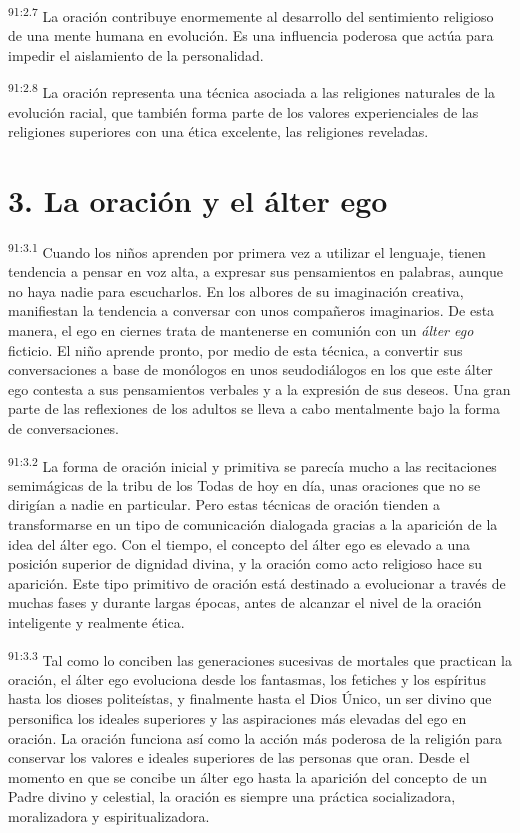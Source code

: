 \documentclass[twoside, 11pt]{book}
\begin{document}
\par
\textsuperscript{91:2.7} La oración contribuye enormemente al desarrollo del sentimiento religioso de una mente humana en evolución. Es una influencia poderosa que actúa para impedir el aislamiento de la personalidad.

\par
\textsuperscript{91:2.8} La oración representa una técnica asociada a las religiones naturales de la evolución racial, que también forma parte de los valores experienciales de las religiones superiores con una ética excelente, las religiones reveladas.

\section*{3. La oración y el álter ego}
\par
\textsuperscript{91:3.1} Cuando los niños aprenden por primera vez a utilizar el lenguaje, tienen tendencia a pensar en voz alta, a expresar sus pensamientos en palabras, aunque no haya nadie para escucharlos. En los albores de su imaginación creativa, manifiestan la tendencia a conversar con unos compañeros imaginarios. De esta manera, el ego en ciernes trata de mantenerse en comunión con un \textit{álter ego} ficticio. El niño aprende pronto, por medio de esta técnica, a convertir sus conversaciones a base de monólogos en unos seudodiálogos en los que este álter ego contesta a sus pensamientos verbales y a la expresión de sus deseos. Una gran parte de las reflexiones de los adultos se lleva a cabo mentalmente bajo la forma de conversaciones.

\par
\textsuperscript{91:3.2} La forma de oración inicial y primitiva se parecía mucho a las recitaciones semimágicas de la tribu de los Todas de hoy en día, unas oraciones que no se dirigían a nadie en particular. Pero estas técnicas de oración tienden a transformarse en un tipo de comunicación dialogada gracias a la aparición de la idea del álter ego. Con el tiempo, el concepto del álter ego es elevado a una posición superior de dignidad divina, y la oración como acto religioso hace su aparición. Este tipo primitivo de oración está destinado a evolucionar a través de muchas fases y durante largas épocas, antes de alcanzar el nivel de la oración inteligente y realmente ética.

\par
\textsuperscript{91:3.3} Tal como lo conciben las generaciones sucesivas de mortales que practican la oración, el álter ego evoluciona desde los fantasmas, los fetiches y los espíritus hasta los dioses politeístas, y finalmente hasta el Dios Único, un ser divino que personifica los ideales superiores y las aspiraciones más elevadas del ego en oración. La oración funciona así como la acción más poderosa de la religión para conservar los valores e ideales superiores de las personas que oran. Desde el momento en que se concibe un álter ego hasta la aparición del concepto de un Padre divino y celestial, la oración es siempre una práctica socializadora, moralizadora y espiritualizadora.
\end{document}
